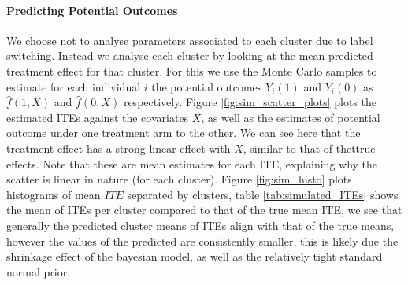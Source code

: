 \documentclass{article}
\begin{document}
\paragraph{Predicting Potential Outcomes} We choose not to analyse parameters associated to each cluster due to label switching. Instead we analyse each cluster by looking at the mean predicted treatment effect for that cluster. For this we use the Monte Carlo samples to estimate for each individual $i$ the potential outcomes $Y_i(1)$ and $Y_i(0)$ as $\hat{f}(1,X)$ and $\hat{f}(0,X)$ respectively. Figure \ref{fig:sim_scatter_plots} plots the estimated ITEs against the covariates $X$, as well as the estimates of potential outcome under one treatment arm to the other. We can see here that the treatment effect has a strong linear effect with $X$, similar to that of thettrue effects. Note that these are mean estimates for each ITE, explaining why the scatter is linear in nature (for each cluster). Figure \ref{fig:sim_histo} plots histograms of mean $ITE$ separated by clusters, table \ref{tab:simulated_ITEs} shows the mean of ITEs per cluster compared to that of the true mean ITE, we see that generally the predicted cluster means of ITEs align with that of the true means, however the values of the predicted are consistently smaller, this is likely due the shrinkage effect of the bayesian model, as well as the relatively tight standard normal prior.
\end{document}
